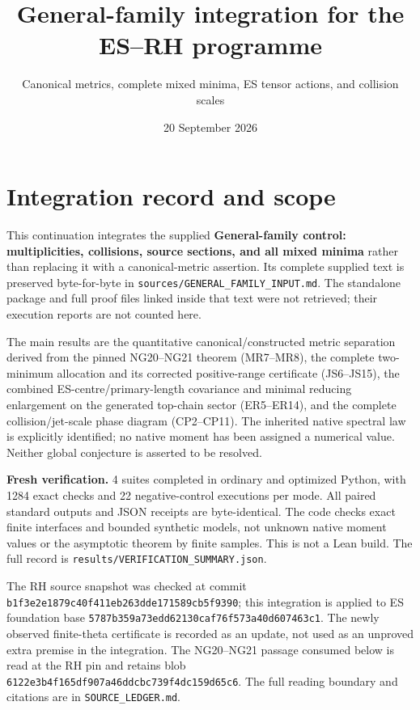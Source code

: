 \documentclass[
  11pt,
]{article}
\title{General-family integration for the ES--RH programme}
\subtitle{Canonical metrics, complete mixed minima, ES tensor actions, and collision scales}
\author{}
\date{20 September 2026}
\begin{document}
\maketitle

{
\setcounter{tocdepth}{2}
\tableofcontents
}
\section{Integration record and
scope}\label{integration-record-and-scope}

This continuation integrates the supplied \textbf{General-family
control: multiplicities, collisions, source sections, and all mixed
minima} rather than replacing it with a canonical-metric assertion. Its
complete supplied text is preserved byte-for-byte in
\texttt{sources/GENERAL\_FAMILY\_INPUT.md}. The standalone package and
full proof files linked inside that text were not retrieved; their
execution reports are not counted here.

The main results are the quantitative canonical/constructed metric
separation derived from the pinned NG20--NG21 theorem (MR7--MR8), the
complete two-minimum allocation and its corrected positive-range
certificate (JS6--JS15), the combined ES-centre/primary-length
covariance and minimal reducing enlargement on the generated top-chain
sector (ER5--ER14), and the complete collision/jet-scale phase diagram
(CP2--CP11). The inherited native spectral law is explicitly identified;
no native moment has been assigned a numerical value. Neither global
conjecture is asserted to be resolved.

\textbf{Fresh verification.} 4 suites completed in ordinary and
optimized Python, with 1284 exact checks and 22 negative-control
executions per mode. All paired standard outputs and JSON receipts are
byte-identical. The code checks exact finite interfaces and bounded
synthetic models, not unknown native moment values or the asymptotic
theorem by finite samples. This is not a Lean build. The full record is
\texttt{results/VERIFICATION\_SUMMARY.json}.

The RH source snapshot was checked at commit
\texttt{b1f3e2e1879c40f411eb263dde171589cb5f9390}; this integration is
applied to ES foundation base
\texttt{5787b359a73edd62130caf76f573a40d607463c1}. The newly observed
finite-theta certificate is recorded as an update, not used as an
unproved extra premise in the integration. The NG20--NG21 passage
consumed below is read at the RH pin and retains blob
\texttt{6122e3b4f165df907a46ddcbc739f4dc159d65c6}. The full reading
boundary and citations are in \texttt{SOURCE\_LEDGER.md}.
\end{document}
